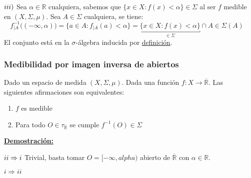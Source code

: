 \documentclass[12pt,a4paper]{article}
\newcommand{\R}{\mathbb{R}}
\newcounter{unit}[section]
\newcounter{chapter}[unit]
\renewcommand{\theunit}{\arabic{unit}}
\renewcommand{\thechapter}{\arabic{chapter}}
\renewcommand{\thesubsubsection}{\theunit.\thechapter.\arabic{subsubsection}}
\newcommand{\result}[1]{%
  \subsubsection{#1}%
  \label{result:\thesubsubsection}
}
\newcommand{\dem}{
    \noindent \underline{\textbf{Demostración:}}
}
\begin{document}
\newpage
$\romannumeral 3)$ Sea $\alpha \in \R$ cualquiera, sabemos que $\{x \in X : f(x) < \alpha\} \in \Sigma$ al ser $f$ medible en $(X, \Sigma, \mu)$.
Sea $A \in \Sigma$ cualquiera, se tiene:
$$f_{|A}^{-1}\bigg((-\infty, \alpha)\bigg) = \{a \in A : f_{|A}(a) < \alpha\} = \underbracket{\{x \in X : f(x) < \alpha\}}_{\in \Sigma} \cap A \in \Sigma(A)$$
El conjunto está en la $\sigma$-álgebra inducida por \hyperref[result:1.1.5]{definición}.

\vspace{6mm}
\result{Medibilidad por imagen inversa de abiertos}
\hspace{3mm} Dado un espacio de medida $(X, \Sigma, \mu)$. Dada una función $f : X \longrightarrow \overline{\R}$. Las siguientes afirmaciones son equivalentes:
\begin{enumerate}[label=\roman*)]
    \item $f$ es medible
    \item Para todo $O \in \tau_{\overline{\R}}$ se cumple $f^{-1}(O) \in \Sigma$
\end{enumerate}
\dem
\begin{tcolorbox}
    $\romannumeral 2 \Rightarrow \romannumeral 1$ \hspace{3mm} Trivial, basta tomar $O = [-\infty, alpha)$ abierto de $\overline{\R}$ con $\alpha \in \R$.
\end{tcolorbox}
\vspace{2mm}
\begin{tcolorbox}
    $\romannumeral 1 \Rightarrow \romannumeral 2$ %
\end{tcolorbox}
\end{document}

